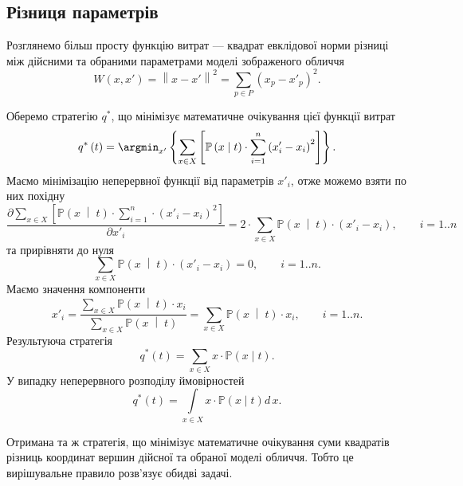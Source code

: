 \subsection{Різниця параметрів}

Розглянемо більш просту функцію витрат ---
квадрат евклідової норми різниці між дійсними та обраними параметрами
моделі зображеного обличчя
\begin{equation*}
  W \left( x, x' \right)
  = \left\| x - x' \right\|^2
  = \sum_{p \in P} \left( x_p - x'_p \right)^2.
\end{equation*}

Оберемо стратегію $q^*$,
що мінімізує математичне очікування цієї функції витрат
\begin{equation*}
  q^* \left( t \right)
  = \argmin_{x'} \left\{
    \sum\limits_{x \in X} \left[
        \mathbb{P} \left( x \;\middle|\;  t \right)
        \cdot \sum_{i = 1}^n \left( x'_i - x_i \right)^2
      \right]
    \right\}.
\end{equation*}
Маємо мінімізацію неперервної функції від параметрів $x'_i$,
отже можемо взяти по них похідну
\begin{equation*}
  \frac{\partial \sum\limits_{x \in X} \left[
      \mathbb{P} \left( x \;\middle|\;  t \right)
      \cdot \sum\limits_{i = 1}^n \cdot \left( x'_i - x_i \right)^2
  \right]}{\partial x'_i}
  = 2 \cdot \sum_{x \in X} \mathbb{P} \left( x \;\middle|\;  t \right)
    \cdot \left( x'_i - x_i \right), \qquad i = 1..n
\end{equation*}
та прирівняти до нуля
\begin{equation*}
  \sum_{x \in X} \mathbb{P} \left( x \;\middle|\;  t \right)
  \cdot \left( x'_i - x_i \right) = 0, \qquad i = 1..n.
\end{equation*}
Маємо значення компоненти
\begin{equation*}
  x'_i = \frac{\sum\limits_{x \in X}
    \mathbb{P} \left( x \;\middle|\;  t \right) \cdot x_i}
    {\sum\limits_{x \in X}
      \mathbb{P} \left( x \;\middle|\;  t \right)}
  = \sum\limits_{x \in X}
    \mathbb{P} \left( x \;\middle|\;  t \right) \cdot x_i, \qquad i = 1..n.
\end{equation*}
Результуюча стратегія
\begin{equation*}
  q^*\left( t \right)
  = \sum_{x \in X} x \cdot \mathbb{P}\left( x \mid t \right).
\end{equation*}
У випадку неперервного розподілу ймовірностей
\begin{equation*}
  q^*\left( t \right)
  = \int\limits_{x \in X} x \cdot \mathbb{P}\left( x \mid t \right) d\,x.
\end{equation*}

Отримана та ж стратегія,
що мінімізує математичне очікування суми квадратів різниць
координат вершин дійсної та обраної моделі обличчя.
Тобто це вирішувальне правило розв'язує обидві задачі.
